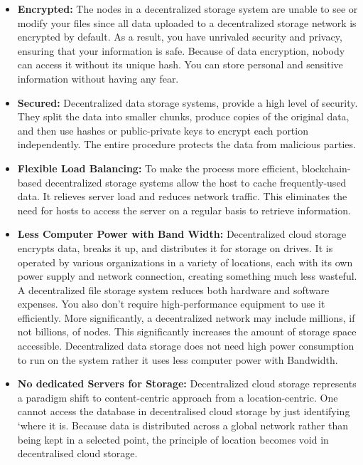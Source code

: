 \begin{itemize}
\item \textbf{Encrypted: }
  The nodes in a decentralized storage system are unable to see or modify your files since all data uploaded to a decentralized storage network is encrypted by default. As a result, you have unrivaled security and privacy, ensuring that your information is safe. Because of data encryption, nobody can access it without its unique hash. You can store personal and sensitive information without having any fear. \\
\item \textbf{Secured: }
  Decentralized data storage systems, provide a high level of security. They split the data into smaller chunks, produce copies of the original data, and then use hashes or public-private keys to encrypt each portion independently. The entire procedure protects the data from malicious parties. \\
\item \textbf{Flexible Load Balancing: }
  To make the process more efficient, blockchain-based decentralized storage systems allow the host to cache frequently-used data. It relieves server load and reduces network traffic. This eliminates the need for hosts to access the server on a regular basis to retrieve information. \\
\item \textbf{Less Computer Power with Band Width: }
  Decentralized cloud storage encrypts data, breaks it up, and distributes it for storage on drives. It is operated by various organizations in a variety of locations, each with its own power supply and network connection, creating something much less wasteful. A decentralized file storage system reduces both hardware and software expenses. You also don’t require high-performance equipment to use it efficiently.  More significantly, a decentralized network may include millions, if not billions, of nodes. This significantly increases the amount of storage space accessible. Decentralized data storage does not need high power consumption to run on the system rather it uses less computer power with Bandwidth. \\
\item \textbf{No dedicated Servers for Storage: }
  Decentralized cloud storage represents a paradigm shift to content-centric approach from a location-centric. One cannot access the database in decentralised cloud storage by just identifying ‘where it is. Because data is distributed across a global network rather than being kept in a selected point, the principle of location becomes void in decentralised cloud storage.


\end{itemize}
